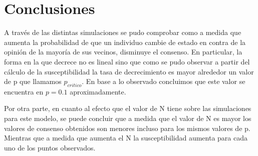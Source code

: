 \documentclass[12pt]{article}
\begin{document}
\section{Conclusiones}
A través de las distintas simulaciones se pudo comprobar como a medida que aumenta la probabilidad de que un individuo cambie de estado en contra de la opinión de la mayoría de sus vecinos, disminuye el consenso. En particular, la forma en la que decrece no es lineal sino que como se pudo observar a partir del cálculo de la susceptibilidad la tasa de decrecimiento es mayor alrededor un valor de p que llamamos $p_{critico}$. En base a lo observado concluimos que este valor se encuentra en $p=0.1$ aproximadamente.

Por otra parte, en cuanto al efecto que el valor de N tiene sobre las simulaciones para este modelo, se puede concluir que a medida que el valor de N es mayor los valores de consenso obtenidos son menores incluso para los mismos valores de p. Mientras que a medida que aumenta el N la susceptibilidad aumenta para cada uno de los puntos observados.
\end{document}
